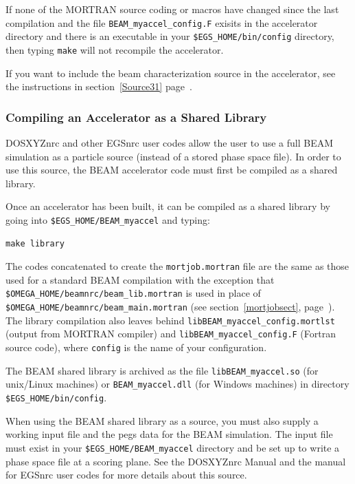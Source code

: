 \documentclass[12pt,twoside]{article}
\begin{document}
If none of the MORTRAN source coding or macros have changed since the last
compilation and the file {\tt BEAM\_myaccel\_config.F} exisits in the
accelerator directory and there is an executable in your
{\tt \$EGS\_HOME/bin/config} directory, then typing {\tt make} will not recompile
the accelerator.

If you want to include the beam characterization source in the accelerator,
see the instructions in section~\ref{Source31} page~\pageref{Source31}.

\subsubsection{Compiling an Accelerator as a Shared Library}
\label{sharedlibsect}

DOSXYZnrc\cite{Wa05} and other EGSnrc user codes\cite{Ro03} allow the user
to use a full BEAM simulation as a particle source (instead of a stored phase space
file).  In order to use this source, the BEAM accelerator code must first
be compiled as a shared library.

Once an accelerator has been built,
it can be compiled
as a shared library by going into {\tt \$EGS\_HOME/BEAM\_myaccel} and
typing:
\begin{verbatim}
make library
\end{verbatim}
The codes concatenated to create the {\tt mortjob.mortran} file are the same
as those used for a standard BEAM compilation with the exception that
\\{\tt \$OMEGA\_HOME/beamnrc/beam\_lib.mortran} is used in place of\\
{\tt \$OMEGA\_HOME/beamnrc/beam\_main.mortran} (see
section~\ref{mortjobsect}, page~\pageref{mortjobsect}).
The library compilation also leaves behind
{\tt libBEAM\_myaccel\_config.mortlst} (output from MORTRAN compiler) and
{\tt libBEAM\_myaccel\_config.F} (Fortran source code), where {\tt config}
is the name of your configuration.

The BEAM shared library is archived as the file {\tt libBEAM\_myaccel.so} (for
unix/Linux machines) or {\tt BEAM\_myaccel.dll} (for Windows machines) in
directory {\tt \$EGS\_HOME/bin/config}.

When using the BEAM shared library as a source, you must also supply
a working input file and the pegs data for the BEAM simulation.  The input
file must exist in your {\tt \$EGS\_HOME/BEAM\_myaccel} directory and
be set up to write a phase space file at a scoring plane.  See the
DOSXYZnrc Manual\cite{Wa05} and the manual for EGSnrc user codes\cite{Ro03}
for more details about this source.
\end{document}
